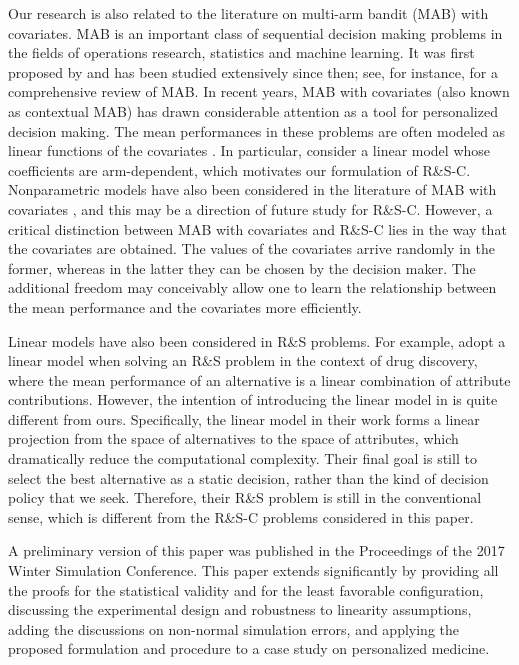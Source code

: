 \documentclass[ijoc,nonblindrev]{informs3}
\begin{document}
Our research is also related to the literature on multi-arm bandit (MAB) with covariates.
MAB is an important class of sequential decision making problems in the fields of operations research, statistics and machine learning.
It was first proposed by \cite{robbins1952} and has been studied extensively since then; see, for instance, \cite{bubeck2012} for a comprehensive review of MAB.
In recent years, MAB with covariates (also known as contextual MAB) has drawn considerable attention as a tool for personalized decision making.
The mean performances in these problems are often modeled as linear functions of the covariates
\citep{auer2002b,rusmevichientong2010}.
In particular, \cite{GoldenshlugerZeevi13} consider a linear model whose coefficients are arm-dependent, which motivates our formulation of R\&S-C.
Nonparametric models have also been considered in the literature of MAB with covariates \citep{perchet2013,slivkins2014}, and this may be a direction of future study for R\&S-C.
However, a critical distinction between MAB with covariates and R\&S-C lies in the way that the covariates  are obtained. The values of the covariates arrive randomly in the former, whereas in the latter they can be chosen by the decision maker. The additional freedom may conceivably allow one to learn the relationship between the mean performance and the covariates more efficiently.



Linear models have also been considered in R\&S problems.
For example, \cite{negoescu2011} adopt a linear model when solving an R\&S problem in the context of drug discovery, where the mean performance of an alternative is a linear combination of attribute contributions.
However, the intention of introducing the linear model in \cite{negoescu2011} is quite different from ours.
Specifically, the linear model in their work forms a linear projection from the space of alternatives to the space of attributes, which dramatically reduce the computational complexity.
Their final goal is still to select the best alternative as a static decision, rather than the kind of decision policy that we seek.
Therefore, their R\&S problem is still in the conventional sense, which is different from the R\&S-C problems considered in this paper.

A preliminary version of this paper \citep{ShenHongZhang17} was published in the Proceedings of the 2017 Winter Simulation Conference.
This paper extends \cite{ShenHongZhang17} significantly by providing all the proofs for the statistical validity and for the least favorable configuration, discussing the experimental design and robustness to linearity assumptions, adding the discussions on non-normal simulation errors, and applying the proposed formulation and procedure to a case study on personalized medicine.
\end{document}
